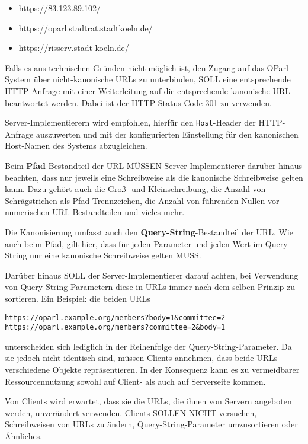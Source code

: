 \documentclass[,a4paper]{article}
\begin{document}
\begin{itemize}
\itemsep1pt\parskip0pt
\item
  https://83.123.89.102/
\item
  https://oparl.stadtrat.stadtkoeln.de/
\item
  https://risserv.stadt-koeln.de/
\end{itemize}

Falls es aus technischen Gründen nicht möglich ist, den Zugang auf das
OParl-System über nicht-kanonische URLs zu unterbinden, SOLL eine
entsprechende HTTP-Anfrage mit einer Weiterleitung auf die entsprechende
kanonische URL beantwortet werden. Dabei ist der HTTP-Status-Code 301 zu
verwenden.

Server-Implementierern wird empfohlen, hierfür den \texttt{Host}-Header
der HTTP-Anfrage auszuwerten und mit der konfigurierten Einstellung für
den kanonischen Host-Namen des Systems abzugleichen.

Beim \textbf{Pfad}-Bestandteil der URL MÜSSEN Server-Implementierer
darüber hinaus beachten, dass nur jeweils eine Schreibweise als die
kanonische Schreibweise gelten kann. Dazu gehört auch die Groß- und
Kleinschreibung, die Anzahl von Schrägstrichen als Pfad-Trennzeichen,
die Anzahl von führenden Nullen vor numerischen URL-Bestandteilen und
vieles mehr.

Die Kanonisierung umfasst auch den \textbf{Query-String}-Bestandteil der
URL. Wie auch beim Pfad, gilt hier, dass für jeden Parameter und jeden
Wert im Query-String nur eine kanonische Schreibweise gelten MUSS.

Darüber hinaus SOLL der Server-Implementierer darauf achten, bei
Verwendung von Query-String-Parametern diese in URLs immer nach dem
selben Prinzip zu sortieren. Ein Beispiel: die beiden URLs

\begin{verbatim}
https://oparl.example.org/members?body=1&committee=2
https://oparl.example.org/members?committee=2&body=1
\end{verbatim}

unterscheiden sich lediglich in der Reihenfolge der
Query-String-Parameter. Da sie jedoch nicht identisch sind, müssen
Clients annehmen, dass beide URLs verschiedene Objekte repräsentieren.
In der Konsequenz kann es zu vermeidbarer Ressourcennutzung sowohl auf
Client- als auch auf Serverseite kommen.

Von Clients wird erwartet, dass sie die URLs, die ihnen von Servern
angeboten werden, unverändert verwenden. Clients SOLLEN NICHT versuchen,
Schreibweisen von URLs zu ändern, Query-String-Parameter umzusortieren
oder Ähnliches.
\end{document}
